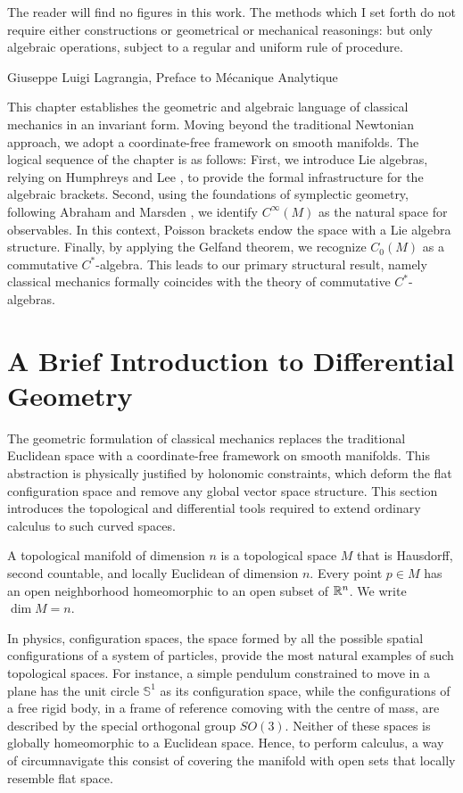 \epigraph{The reader will find no figures in this work. The methods which I set forth do not require either constructions or geometrical or mechanical reasonings: but only algebraic operations, subject to a regular and uniform rule of procedure.}{Giuseppe Luigi Lagrangia, Preface to Mécanique Analytique \cite{lagrangeMecaniqueAnalytique2009}}

\noindent This chapter establishes the geometric and algebraic language of classical mechanics in an invariant form. Moving beyond the traditional Newtonian approach, we adopt a coordinate-free framework on smooth manifolds. The logical sequence of the chapter is as follows: First, we introduce Lie algebras, relying on Humphreys \cite{humphreysIntroductionLieAlgebras2010} and Lee \cite{leeIntroductionSmoothManifolds2013}, to provide the formal infrastructure for the algebraic brackets. Second, using the foundations of symplectic geometry, following Abraham and Marsden \cite{abrahamFoundationsMechanics2008}, we identify $C^\infty(M)$ as the natural space for observables. In this context, Poisson brackets endow the space with a Lie algebra structure. Finally, by applying the Gelfand theorem, we recognize $C_0(M)$ as a commutative $C^*$-algebra. This leads to our primary structural result, namely classical mechanics formally coincides with the theory of commutative $C^*$-algebras.

\section{A Brief Introduction to Differential Geometry}

The geometric formulation of classical mechanics replaces the traditional Euclidean space with a coordinate-free framework on smooth manifolds. This abstraction is physically justified by holonomic constraints, which deform the flat configuration space and remove any global vector space structure. This section introduces the topological and differential tools required to extend ordinary calculus to such curved spaces.

\begin{definition}\label{def:top-man}
	A topological manifold of dimension $n$ is a topological space $M$ that is Hausdorff, second countable, and locally Euclidean of dimension $n$. Every point $p \in M$ has an open neighborhood homeomorphic to an open subset of $\mathbb{R}^n$. We write $\dim M = n$.
\end{definition}

In physics, configuration spaces, the space formed by all the possible spatial configurations of a system of particles, provide the most natural examples of such topological spaces. For instance, a simple pendulum constrained to move in a plane has the unit circle $\mathbb{S}^1$ as its configuration space, while the configurations of a free rigid body, in a frame of reference comoving with the centre of mass, are described by the special orthogonal group $SO(3)$. Neither of these spaces is globally homeomorphic to a Euclidean space. Hence, to perform calculus, a way of circumnavigate this consist of covering the manifold with open sets that locally resemble flat space.

